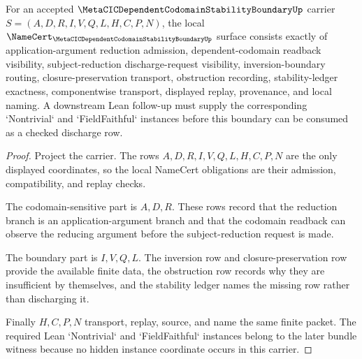 \begin{theorem}
\label{thm:metacic-dependent-codomain-stability-boundary-obligations}
For an accepted $\MetaCICDependentCodomainStabilityBoundaryUp$ carrier $S=(A,D,R,I,V,Q,L,H,C,P,N)$, the local $\NameCert_{\MetaCICDependentCodomainStabilityBoundaryUp}$ surface consists exactly of application-argument reduction admission, dependent-codomain readback visibility, subject-reduction discharge-request visibility, inversion-boundary routing, closure-preservation transport, obstruction recording, stability-ledger exactness, componentwise transport, displayed replay, provenance, and local naming. A downstream Lean follow-up must supply the corresponding `Nontrivial` and `FieldFaithful` instances before this boundary can be consumed as a checked discharge row.
\end{theorem}
\begin{proof}
Project the carrier. The rows $A,D,R,I,V,Q,L,H,C,P,N$ are the only displayed coordinates, so the local NameCert obligations are their admission, compatibility, and replay checks.

The codomain-sensitive part is $A,D,R$. These rows record that the reduction branch is an application-argument branch and that the codomain readback can observe the reducing argument before the subject-reduction request is made.

The boundary part is $I,V,Q,L$. The inversion row and closure-preservation row provide the available finite data, the obstruction row records why they are insufficient by themselves, and the stability ledger names the missing row rather than discharging it.

Finally $H,C,P,N$ transport, replay, source, and name the same finite packet. The required Lean `Nontrivial` and `FieldFaithful` instances belong to the later bundle witness because no hidden instance coordinate occurs in this carrier.
\end{proof}


